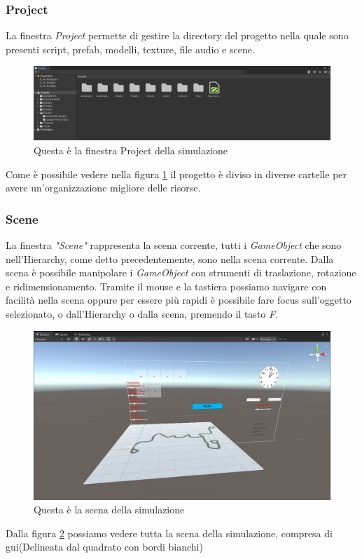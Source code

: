 \documentclass[12pt, openany]{book}
\begin{document}
	\subsubsection{Project}
	La finestra \emph{Project} permette di gestire la directory del progetto nella quale sono presenti script, prefab, modelli, texture, file audio e scene.
	\begin{figure}[H]
		\centering
		\includegraphics[width=1\linewidth]{"Immagini/Project"}
		\caption{Questa è la finestra Project della simulazione}
		\label{fig:Project}	
	\end{figure}
	Come è possibile vedere nella figura \ref{fig:Project} il progetto è diviso in diverse cartelle per avere un'organizzazione migliore delle risorse.
	
	\subsubsection{Scene}
		La finestra \emph{"Scene"} rappresenta la scena corrente, tutti i \emph{GameObject} che sono nell'Hierarchy, come detto precedentemente, sono nella scena corrente. Dalla scena è possibile manipolare i \emph{GameObject} con strumenti di traslazione, rotazione e ridimensionamento. Tramite il mouse e la tastiera possiamo navigare con facilità nella scena oppure per essere più rapidi è possibile fare focus sull'oggetto selezionato, o dall'Hierarchy o dalla scena, premendo il tasto \emph{F}.
		\begin{figure}[H]
			\centering
			\includegraphics[width=0.72\linewidth]{"Immagini/Scene.png"}
			\caption{Questa è la scena della simulazione}
			\label{fig:Scene}
		\end{figure}
	Dalla figura \ref{fig:Scene} possiamo vedere tutta la scena della simulazione, compresa di gui(Delineata dal quadrato con bordi bianchi)
\end{document}
